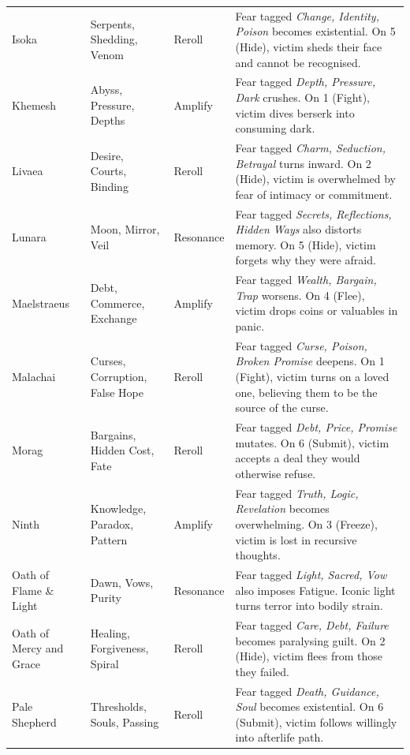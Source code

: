 \begin{longtable}{@{}p{3.2cm}p{4.5cm}p{2.8cm}p{5.9cm}@{}}
Isoka & Serpents, Shedding, Venom & Reroll & 
Fear tagged \emph{Change, Identity, Poison} becomes existential. On 5 (Hide), victim sheds their face and cannot be recognised. \\

Khemesh & Abyss, Pressure, Depths & Amplify & 
Fear tagged \emph{Depth, Pressure, Dark} crushes. On 1 (Fight), victim dives berserk into consuming dark. \\

Livaea & Desire, Courts, Binding & Reroll & 
Fear tagged \emph{Charm, Seduction, Betrayal} turns inward. On 2 (Hide), victim is overwhelmed by fear of intimacy or commitment. \\

Lunara & Moon, Mirror, Veil & Resonance & 
Fear tagged \emph{Secrets, Reflections, Hidden Ways} also distorts memory. On 5 (Hide), victim forgets why they were afraid. \\

Maelstraeus & Debt, Commerce, Exchange & Amplify & 
Fear tagged \emph{Wealth, Bargain, Trap} worsens. On 4 (Flee), victim drops coins or valuables in panic. \\

Malachai & Curses, Corruption, False Hope & Reroll & 
Fear tagged \emph{Curse, Poison, Broken Promise} deepens. On 1 (Fight), victim turns on a loved one, believing them to be the source of the curse. \\

Morag & Bargains, Hidden Cost, Fate & Reroll & 
Fear tagged \emph{Debt, Price, Promise} mutates. On 6 (Submit), victim accepts a deal they would otherwise refuse. \\

Ninth & Knowledge, Paradox, Pattern & Amplify & 
Fear tagged \emph{Truth, Logic, Revelation} becomes overwhelming. On 3 (Freeze), victim is lost in recursive thoughts. \\

Oath of Flame \& Light & Dawn, Vows, Purity & Resonance & 
Fear tagged \emph{Light, Sacred, Vow} also imposes Fatigue. Iconic light turns terror into bodily strain. \\

Oath of Mercy and Grace & Healing, Forgiveness, Spiral & Reroll & 
Fear tagged \emph{Care, Debt, Failure} becomes paralysing guilt. On 2 (Hide), victim flees from those they failed. \\

Pale Shepherd & Thresholds, Souls, Passing & Reroll & 
Fear tagged \emph{Death, Guidance, Soul} becomes existential. On 6 (Submit), victim follows willingly into afterlife path. \\


\end{longtable}
